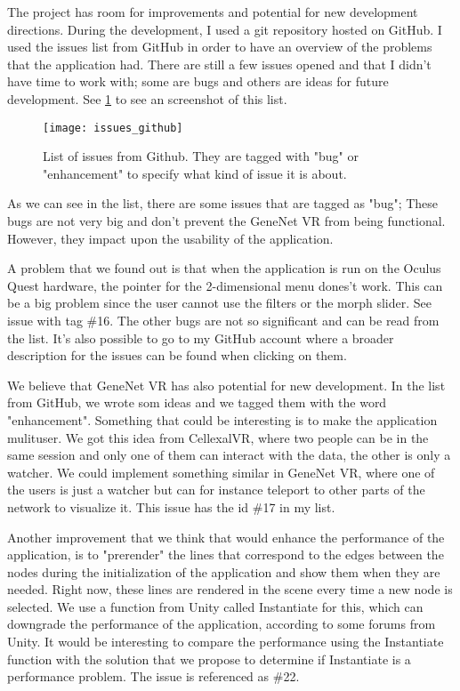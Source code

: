 The project has room for improvements and potential for new development directions. During the development, I used a git repository hosted on GitHub. I used the issues list from GitHub in order to have an overview of the problems that the application had. There are still a few issues opened and that I didn't have time to work with; some are bugs and others are ideas for future development. See \ref{fig:issues} to see an screenshot of this list.

\begin{figure}[h!]
    \setlength{\tempheight}{15ex}
    \centering
    \texttt{[image: issues\_github]}
    \caption{List of issues from Github. They are tagged with "bug" or "enhancement" to specify what kind of issue it is about.}
    \label{fig:issues}
\end{figure}

As we can see in the list, there are some issues that are tagged as "bug"; These bugs are not very big and don't prevent the GeneNet VR from being functional. However, they impact upon the usability of the application.

A problem that we found out is that when the application is run on the Oculus Quest hardware, the pointer for the 2-dimensional menu dones't work. This can be a big problem since the user cannot use the filters or the morph slider. See issue with tag \#16. The other bugs are not so significant and can be read from the list. It's also possible to go to my GitHub account where a broader description for the issues can be found when clicking on them.

We believe that GeneNet VR has also potential for new development. In the list from GitHub, we wrote som ideas and we tagged them with the word "enhancement". Something that could be interesting is to make the application mulituser. We got this idea from CellexalVR\cite{cellexalvr}, where two people can be in the same session and only one of them can interact with the data, the other is only a watcher. We could implement something similar in GeneNet VR, where one of the users is just a watcher but can for instance teleport to other parts of the network to visualize it. This issue has the id \#17 in my list.

Another improvement that we think that would enhance the performance of the application, is to "prerender" the lines that correspond to the edges between the nodes during the initialization of the application and show them when they are needed. Right now, these lines are rendered in the scene every time a new node is selected. We use a function from Unity called Instantiate for this, which can downgrade the performance of the application, according to some forums from Unity.
It would be interesting to compare the performance using the Instantiate function with the solution that we propose to determine if Instantiate is a performance problem. The issue is referenced as \#22.

